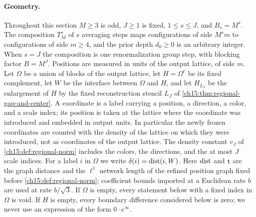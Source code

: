 \paragraph{Geometry.}
Throughout this section $M\ge3$ is odd, $J\ge1$ is fixed, $1\le s\le J$, and $B_s=M^s$. The composition $T_M^s$ of $s$ averaging steps maps configurations of side $M^sm$ to configurations of side $m\ge4$, and the prior depth $d_0\ge0$ is an arbitrary integer. When $s=J$ the composition is one renormalization group step, with blocking factor $B=M^J$. Positions are measured in units of the output lattice, of side $m$. Let $\Omega$ be a union of blocks of the output lattice, let $H=\Omega^c$ be its fixed complement, let $W$ be the interface between $\Omega$ and $H$, and let $H_{L_J}$ be the enlargement of $H$ by the fixed reconstruction stencil $L_J$ of \cref{ch15:thm:regional-gap-and-center}. A coordinate is a label carrying a position, a direction, a color, and a scale index; its position is taken at the lattice where the coordinate was introduced and embedded in output units. In particular the newly frozen coordinates are counted with the density of the lattice on which they were introduced, not as coordinates of the output lattice. The density constant $v_J$ of \cref{ch15:def:regional-norm} includes the colors, the directions, and the at most $J$ scale indices. For a label $i$ in $\Omega$ we write $\delta(i)=\operatorname{dist}(i,W)$. Here $\operatorname{dist}$ and $\mathsf t$ are the graph distance and the $\ell^1$ network length of the refined position graph fixed before \cref{ch15:def:regional-norm}; coefficient bounds imported at a Euclidean rate $b$ are used at rate $b/\sqrt3$. If $\Omega$ is empty, every statement below with a fixed index in $\Omega$ is void. If $H$ is empty, every boundary difference considered below is zero; we never use an expression of the form $0\cdot e^{\infty}$.

